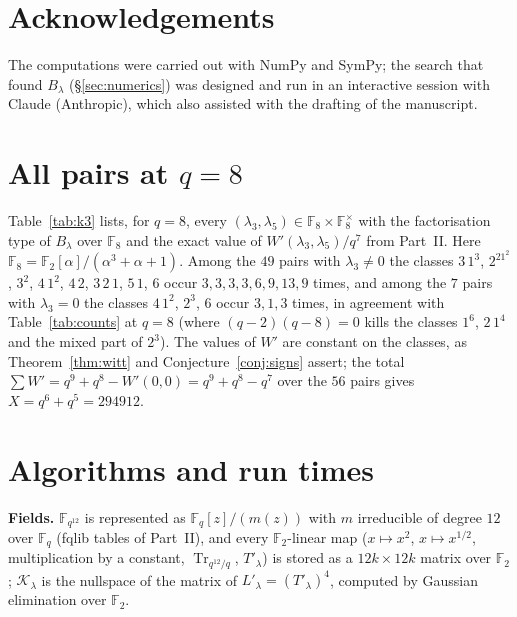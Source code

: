 \documentclass[12pt,a4paper]{amsart}
\theoremstyle{definition}
\newcommand{\F}{\mathbb{F}}
\newcommand{\Tr}{\operatorname{Tr}}
\newcommand{\Kk}{\mathcal{K}}
\begin{document}
\section*{Acknowledgements}
The computations were carried out with NumPy and SymPy; the search that found $B_\lambda$ (\S\ref{sec:numerics}) was designed and run in an interactive session with Claude (Anthropic), which also assisted with the drafting of the manuscript.

\appendix

\section{All pairs at \texorpdfstring{$q=8$}{q=8}}\label{app:k3}
Table~\ref{tab:k3} lists, for $q=8$, every $(\lambda_3,\lambda_5)\in\F_8\times\F_8^\times$ with the factorisation type of $B_\lambda$ over $\F_8$ and the exact value of $W'(\lambda_3,\lambda_5)/q^7$ from Part~II. Here $\F_8=\F_2[\alpha]/(\alpha^3+\alpha+1)$. Among the $49$ pairs with $\lambda_3\ne0$ the classes $3\,1^3$, $2^21^2$, $3^2$, $4\,1^2$, $4\,2$, $3\,2\,1$, $5\,1$, $6$ occur $3,3,3,3,6,9,13,9$ times, and among the $7$ pairs with $\lambda_3=0$ the classes $4\,1^2$, $2^3$, $6$ occur $3,1,3$ times, in agreement with Table~\ref{tab:counts} at $q=8$ (where $(q-2)(q-8)=0$ kills the classes $1^6$, $2\,1^4$ and the mixed part of $2^3$). The values of $W'$ are constant on the classes, as Theorem~\ref{thm:witt} and Conjecture~\ref{conj:signs} assert; the total $\sum W'=q^9+q^8-W'(0,0)=q^9+q^8-q^7$ over the $56$ pairs gives $X=q^6+q^5=294912$.

\begin{table}[H]
\centering
\caption{$q=8$: all pairs $(\lambda_3,\lambda_5)$, the class of $B_\lambda$ and $W'/q^7$ (generated by \texttt{appendix\_table\_k3.py}).}\label{tab:k3}
\footnotesize

\end{table}

\section{Algorithms and run times}\label{app:algo}
\textbf{Fields.} $\F_{q^{12}}$ is represented as $\F_q[z]/(m(z))$ with $m$ irreducible of degree $12$ over $\F_q$ (fqlib tables of Part~II), and every $\F_2$-linear map ($x\mapsto x^2$, $x\mapsto x^{1/2}$, multiplication by a constant, $\Tr_{q^{12}/q}$, $T'_\lambda$) is stored as a $12k\times12k$ matrix over $\F_2$; $\Kk_\lambda$ is the nullspace of the matrix of $L'_\lambda=(T'_\lambda)^4$, computed by Gaussian elimination over $\F_2$.
\end{document}
